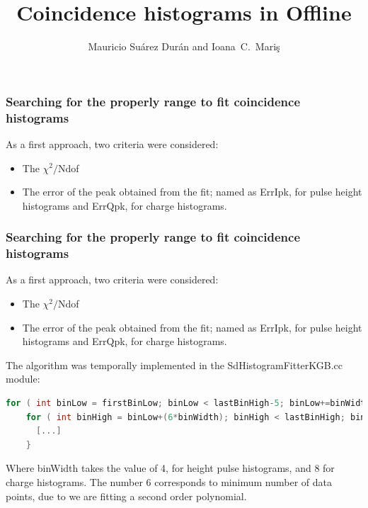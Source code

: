 \documentclass[aspectratio=169]{beamer}
\title{Coincidence histograms in Offline}
\author{
  Mauricio Su\'arez Dur\'an and Ioana~C.~Mari\c{s}
}
\institute{IIHE-ULB}
\begin{document}
\begin{frame}
  \titlepage
\end{frame}

\begin{frame}
  \frametitle{Searching for the properly range to fit coincidence
  histograms}
  As a first approach, two criteria were considered:
  \vspace{0.5cm}
  \begin{itemize}
    \item<2-> The $\chi^2/$Ndof     
    \item<3-> The error of the peak obtained from the fit; named
      as ErrIpk, for pulse height histograms and ErrQpk, for
      charge histograms.
  \end{itemize}
\end{frame}

\begin{frame}[fragile]
  \frametitle{Searching for the properly range to fit coincidence
  histograms}
  As a first approach, two criteria were considered:
  \vspace{0.5cm}
  \begin{itemize}
    \item The $\chi^2/$Ndof     
    \item The error of the peak obtained from the fit; named
      as ErrIpk, for pulse height histograms and ErrQpk, for
      charge histograms.
  \end{itemize}
  \vspace{1.0cm}

  The algorithm was temporally implemented in the
  SdHistogramFitterKGB.cc module:
  \begin{lstlisting}[language=C++, basicstyle = \ttfamily\tiny]
  for ( int binLow = firstBinLow; binLow < lastBinHigh-5; binLow+=binWidth )
    for ( int binHigh = binLow+(6*binWidth); binHigh < lastBinHigh; binHigh+=binWidth ) {
      [...]
    }
  \end{lstlisting}
  Where binWidth takes the value of 4, for height pulse
  histograms, and 8 for charge histograms. The number 6
  corresponds to minimum number of data points, due to we are
  fitting a second order polynomial.
\end{frame}
\end{document}
